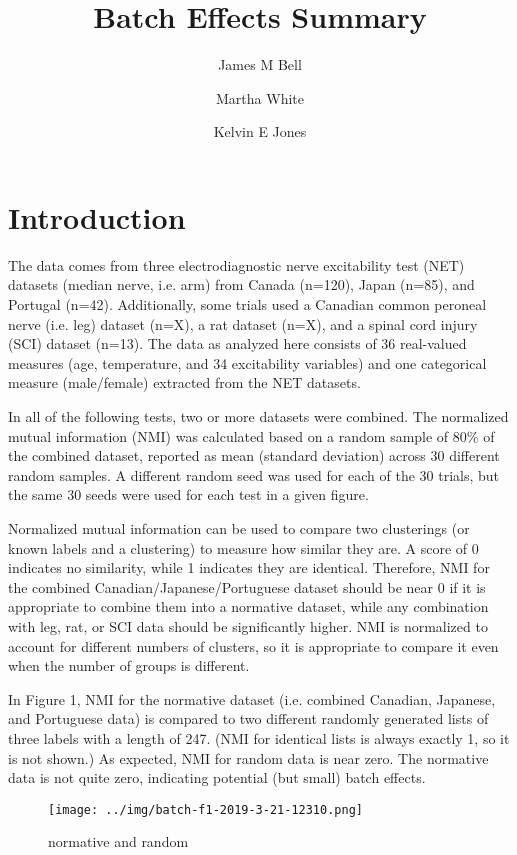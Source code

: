 \documentclass[12pt]{article}
\title{Batch Effects Summary}
\author[1,2]{James M Bell}
\author[2]{Martha White}
\author[1,3]{Kelvin E Jones}
\affil[1]{Neuroscience and Mental Health Institute, University of Alberta}
\affil[2]{Department of Computing Science, University of Alberta}
\affil[2]{Department of Kinesiology, Sport, and Recreation, University of Alberta}
\begin{document}
\maketitle

\section{Introduction}

The data comes from three electrodiagnostic nerve excitability test (NET) datasets (median nerve, i.e. arm) from Canada (n=120), Japan (n=85), and Portugal (n=42). Additionally, some trials used a Canadian common peroneal nerve (i.e. leg) dataset (n=X), a rat dataset (n=X), and a spinal cord injury (SCI) dataset (n=13). The data as analyzed here consists of 36 real-valued measures (age, temperature, and 34 excitability variables) and one categorical measure (male/female) extracted from the NET datasets.


In all of the following tests, two or more datasets were combined. The normalized mutual information (NMI) was calculated based on a random sample of 80\% of the combined dataset, reported as mean (standard deviation) across 30 different random samples. A different random seed was used for each of the 30 trials, but the same 30 seeds were used for each test in a given figure.

Normalized mutual information can be used to compare two clusterings (or known labels and a clustering) to measure how similar they are. A score of 0 indicates no similarity, while 1 indicates they are identical. Therefore, NMI for the combined Canadian/Japanese/Portuguese dataset should be near 0 if it is appropriate to combine them into a normative dataset, while any combination with leg, rat, or SCI data should be significantly higher. NMI is normalized to account for different numbers of clusters, so it is appropriate to compare it even when the number of groups is different.

In Figure 1, NMI for the normative dataset (i.e. combined Canadian, Japanese, and Portuguese data) is compared to two different randomly generated lists of three labels with a length of 247. (NMI for identical lists is always exactly 1, so it is not shown.) As expected, NMI for random data is near zero. The normative data is not quite zero, indicating potential (but small) batch effects.

\begin{figure*}
  \centering
       \texttt{[image: ../img/batch-f1-2019-3-21-12310.png]}
  \caption{normative and random}
  \label{fig:MI}
\end{figure*}
\end{document}
